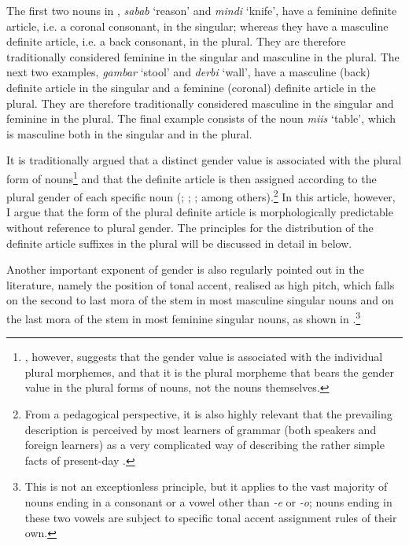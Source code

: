 \documentclass[output=paper]{langsci/langscibook}
\begin{document}
The first two nouns in , \textit{sabab} ‘reason’ and \textit{mindi} ‘knife’, have a feminine definite article, i.e. a coronal consonant, in the singular; whereas they have a masculine definite article, i.e. a back consonant, in the plural. They are therefore traditionally considered feminine in the singular and masculine in the plural. The next two examples, \textit{gambar} ‘stool’ and \textit{derbi} ‘wall’, have a masculine (back) definite article in the singular and a feminine (coronal) definite article in the plural. They are therefore traditionally considered masculine in the singular and feminine in the plural. The final example consists of the noun \textit{miis} ‘table’, which is masculine both in the singular and in the plural.

\newpage 
It is traditionally argued that a distinct gender value is associated with the plural form of nouns\footnote{\citet{Lecarme2002}, however, suggests that the gender value is associated with the individual plural morphemes, and that it is the plural morpheme that bears the gender value in the plural forms of nouns, not the nouns themselves.} and that the definite article is then assigned according to the plural gender of each specific noun (\citealt{ElSolamiMewis1988}; \citealt[54--55]{Saeed1999}; \citealt[48--49]{Berchem2012}; among others).\footnote{From a pedagogical perspective, it is also highly relevant that the prevailing description is perceived by most learners of  grammar (both  speakers and foreign learners) as a very complicated way of describing the rather simple facts of present-day .}  In this article, however, I argue that the form of the plural definite article is morphologically predictable without reference to plural gender. The principles for the distribution of the definite article suffixes in the plural will be discussed in detail in  below.

Another important exponent of gender is also regularly pointed out in the literature, namely the position of tonal accent, realised as high pitch, which falls on the second to last mora of the stem in most masculine singular nouns and on the last mora of the stem in most feminine singular nouns, as shown in .\footnote{This is not an exceptionless principle, but it applies to the vast majority of nouns ending in a consonant or a vowel other than \textit{-e} or \textit{-o}; nouns ending in these two vowels are subject to specific tonal accent assignment rules of their own.}
 
\end{document}
